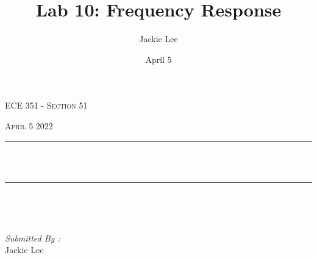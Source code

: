 \documentclass[12pt]{report}
\title{Lab 10: Frequency Response}
\author{ Jackie Lee}
\date{April 5}
\makeatletter
\let\thetitle\@title
\makeatother
\begin{document}

\begin{titlepage}
	\centering
    \vspace*{0.5 cm}
\begin{center}    \textsc{\Large   ECE 351 - Section 51 }\\[2.0 cm]	\end{center}%
	\textsc{\Large April 5 2022  }\\[0.5 cm]				%
	\rule{\linewidth}{0.2 mm} \\[0.4 cm]
	{ \huge \bfseries \thetitle}\\
	\rule{\linewidth}{0.2 mm} \\[1.5 cm]
	
	\begin{minipage}{0.4\textwidth}
		\begin{flushleft} \large
			\end{flushleft}
			\end{minipage}~
			\begin{minipage}{0.4\textwidth}
            
			\begin{flushright} \large
			\emph{Submitted By :} \\
			Jackie Lee  
		\end{flushright}
           
	\end{minipage}\\[2 cm]
	
    
    
    
    
	
\end{titlepage}


\tableofcontents
\pagebreak

\renewcommand{\thesection}{\arabic{section}}
\end{document}
